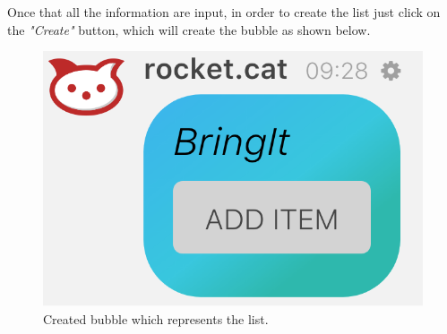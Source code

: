Once that all the information are input, in order to create the list just click on the \textit{"Create"} button, which will create the bubble as shown below.

\begin{figure}[H]
  \centering 
  \includegraphics[scale=0.3]{Sections/3-HowToUse/Images/bubble.png}
  \caption{Created bubble which represents the list.}
\end{figure}